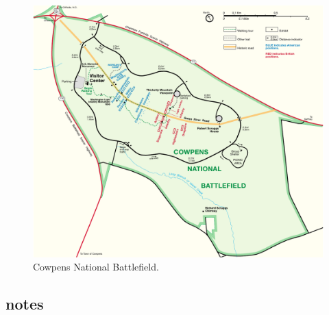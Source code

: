 \lipsum[3]
\begin{figure}[h]
	\singlespacing
	\begin{center}
	\includegraphics[width=6in]{gfx/cowpens_park97}
	\end{center}
	\caption{Cowpens National Battlefield.}
	\label{cowppark97}
\end{figure}


\subsection{notes}


